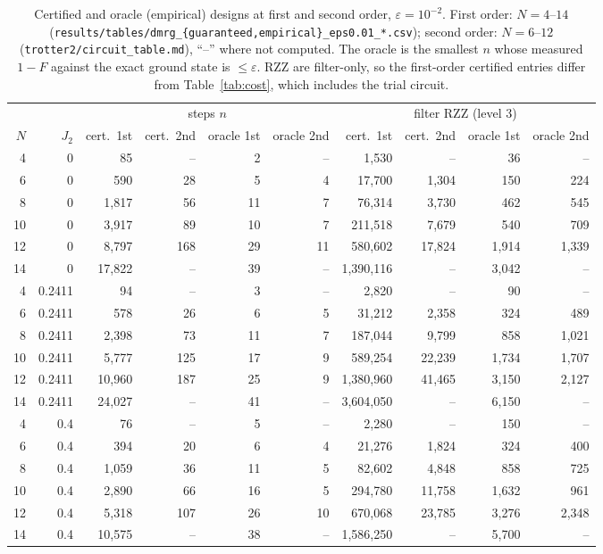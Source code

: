 \documentclass[11pt]{article}
\newcommand{\eps}{\varepsilon}
\begin{document}
\begin{table}[h]
\centering
\small
\begin{tabular}{rr rrrr rrrr}
\toprule
 & & \multicolumn{4}{c}{steps $n$} & \multicolumn{4}{c}{filter RZZ (level 3)} \\
\cmidrule(lr){3-6}\cmidrule(lr){7-10}
$N$ & $J_2$ & cert.\ 1st & cert.\ 2nd & oracle 1st & oracle 2nd & cert.\ 1st & cert.\ 2nd & oracle 1st & oracle 2nd \\
\midrule
 4 & 0      & 85 & -- & 2 & -- & 1,530 & -- & 36 & -- \\
 6 & 0      & 590 & 28 & 5 & 4 & 17,700 & 1,304 & 150 & 224 \\
 8 & 0      & 1,817 & 56 & 11 & 7 & 76,314 & 3,730 & 462 & 545 \\
10 & 0      & 3,917 & 89 & 10 & 7 & 211,518 & 7,679 & 540 & 709 \\
12 & 0      & 8,797 & 168 & 29 & 11 & 580,602 & 17,824 & 1,914 & 1,339 \\
14 & 0      & 17,822 & -- & 39 & -- & 1,390,116 & -- & 3,042 & -- \\
\midrule
 4 & 0.2411 & 94 & -- & 3 & -- & 2,820 & -- & 90 & -- \\
 6 & 0.2411 & 578 & 26 & 6 & 5 & 31,212 & 2,358 & 324 & 489 \\
 8 & 0.2411 & 2,398 & 73 & 11 & 7 & 187,044 & 9,799 & 858 & 1,021 \\
10 & 0.2411 & 5,777 & 125 & 17 & 9 & 589,254 & 22,239 & 1,734 & 1,707 \\
12 & 0.2411 & 10,960 & 187 & 25 & 9 & 1,380,960 & 41,465 & 3,150 & 2,127 \\
14 & 0.2411 & 24,027 & -- & 41 & -- & 3,604,050 & -- & 6,150 & -- \\
\midrule
 4 & 0.4    & 76 & -- & 5 & -- & 2,280 & -- & 150 & -- \\
 6 & 0.4    & 394 & 20 & 6 & 4 & 21,276 & 1,824 & 324 & 400 \\
 8 & 0.4    & 1,059 & 36 & 11 & 5 & 82,602 & 4,848 & 858 & 725 \\
10 & 0.4    & 2,890 & 66 & 16 & 5 & 294,780 & 11,758 & 1,632 & 961 \\
12 & 0.4    & 5,318 & 107 & 26 & 10 & 670,068 & 23,785 & 3,276 & 2,348 \\
14 & 0.4    & 10,575 & -- & 38 & -- & 1,586,250 & -- & 5,700 & -- \\
\bottomrule
\end{tabular}
\caption{Certified and oracle (empirical) designs at first and second order, $\eps=10^{-2}$. First order:
$N=4$--$14$ (\texttt{results/tables/dmrg\_\{guaranteed,empirical\}\_eps0.01\_*.csv}); second order: $N=6$--$12$
(\texttt{trotter2/circuit\_table.md}), ``--'' where not computed. The oracle is the smallest $n$ whose measured $1-F$
against the exact ground state is $\le\eps$. RZZ are filter-only, so the first-order certified entries differ from
Table~\ref{tab:cost}, which includes the trial circuit.}
\label{tab:second}
\end{table}
\end{document}
